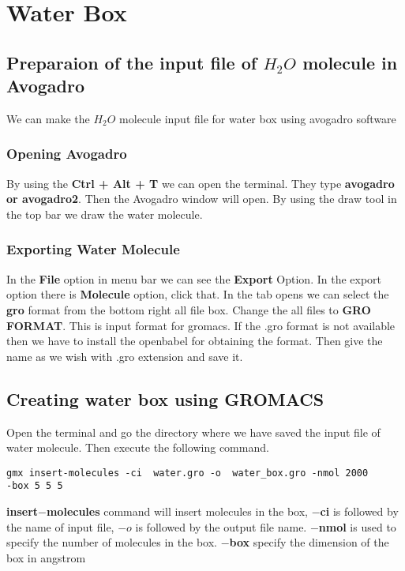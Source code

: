 \section{Water Box}
\subsection{Preparaion of the input file of $H_2O$ molecule in Avogadro}

We can make the $H_2O$ molecule input file  for  water  box using avogadro software
\subsubsection{Opening Avogadro}
By using the \textbf{Ctrl  + Alt + T} we can open the terminal. They  type \textbf{avogadro or avogadro2}. Then the Avogadro  window will open. By using the  draw tool  in the  top bar we draw the water molecule.
\subsubsection{Exporting Water Molecule}
In the \textbf{File} option in menu bar we can see the \textbf{Export} Option. In the export option there is \textbf{Molecule} option, click  that. In the tab opens we can select the \textbf{gro} format from the bottom right all file box. Change the  all files to  \textbf{GRO FORMAT}.  This  is  input format for gromacs. If the .gro format is not available then we have to install the openbabel for obtaining the format.  Then give the name as we wish with .gro  extension and save it.
\subsection{Creating water box using GROMACS}

Open the terminal and go the directory where we have saved the  input file of water molecule. Then execute the following command.\\

\label{water_box}\begin{verbatim}
gmx insert-molecules -ci  water.gro -o  water_box.gro -nmol 2000 
-box 5 5 5
\end{verbatim} 

\textbf{insert$-$molecules} command will insert molecules in the  box, \textbf{$-$ci} is followed by the name of input file, \textbf{$-o$} is followed by the output file name. \textbf{$-$nmol} is used to  specify the number of molecules in the box. \textbf{$-$box} specify the dimension of the box in  angstrom 

